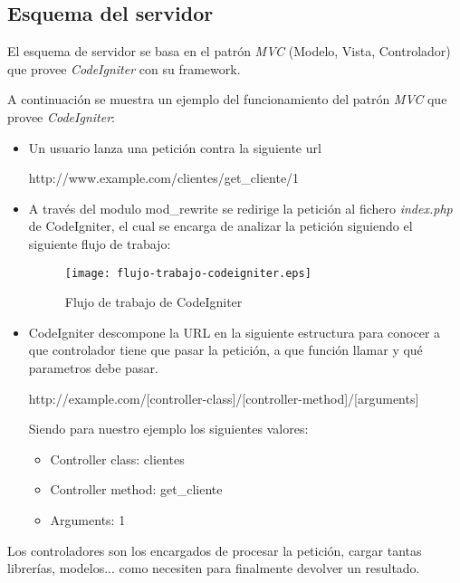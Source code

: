 \subsection{Esquema del servidor}

    El esquema de servidor se basa en el patrón \emph{MVC} (Modelo, Vista, Controlador) que provee \emph{CodeIgniter} con su framework.

    A continuación se muestra un ejemplo del funcionamiento del patrón \emph{MVC} que provee \emph{CodeIgniter}:

        \begin{itemize}
            \item Un usuario lanza una petición contra la siguiente url

                http://www.example.com/clientes/get\_cliente/1

            \item A través del modulo mod\_rewrite se redirige la petición al fichero \emph{index.php} de CodeIgniter, el cual se encarga de analizar la petición siguiendo el siguiente flujo de trabajo:

            \begin{figure}[H]
                \centering
                \texttt{[image: flujo-trabajo-codeigniter.eps]}
                \caption{Flujo de trabajo de CodeIgniter}\label{fig:flujo-trabajo-codeigniter}
            \end{figure}

            \item CodeIgniter descompone la URL en la siguiente estructura para conocer a que controlador tiene que pasar la petición, a que función llamar y qué parametros debe pasar.

                http://example.com/[controller-class]/[controller-method]/[arguments]

            Siendo para nuestro ejemplo los siguientes valores:

                \begin{itemize}
                    \item Controller class: clientes
                    \item Controller method: get\_cliente
                    \item Arguments: 1
                \end{itemize}
        \end{itemize}

    Los controladores son los encargados de procesar la petición, cargar tantas librerías, modelos... como necesiten para finalmente devolver un resultado.

